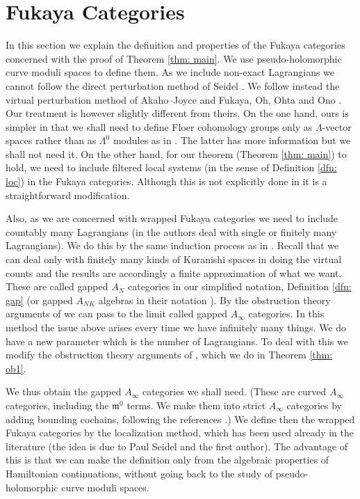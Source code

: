 \documentclass{article}
\theoremstyle{plain}%
\theoremstyle{definition}
\numberwithin{equation}{section}
\numberwithin{figure}{section}
\def\l{\label}
\def\fm{{\mathfrak m}}
\def\La{\Lambda}
\def\iy{\infty}
\begin{document}
\section{Fukaya Categories}\l{sec: Floer}
In this section we explain the definition and properties of the Fukaya categories concerned with the proof of Theorem \ref{thm: main}. We use pseudo-holomorphic curve moduli spaces to define them. As we include non-exact Lagrangians we cannot follow the direct perturbation method of Seidel \cite{Seid3}. We follow instead the virtual perturbation method of Akaho--Joyce \cite{AJ} and Fukaya, Oh, Ohta and Ono \cite{FOOO}. Our treatment is however slightly different from theirs. On the one hand, ours is simpler in that we shall need to define Floer cohomology groups only as $\La$-vector spaces rather than as $\La^0$ modules as in \cite{AJ,FOOO}. The latter has more information but we shall not need it. On the other hand, for our theorem (Theorem \ref{thm: main}) to hold, we need to include filtered local systems (in the sense of Definition \ref{dfn: loc}) in the Fukaya categories. Although this is not explicitly done in \cite{AJ,FOOO} it is a straightforward modification.

Also, as we are concerned with wrapped Fukaya categories we need to include countably many Lagrangians (in \cite{AJ,FOOO} the authors deal with single or finitely many Lagrangians). We do this by the same induction process as in \cite{AJ,FOOO}. Recall that we can deal only with finitely many kinds of Kuranishi spaces in doing the virtual counts \cite[\S7.2.3]{FOOO} and the results are accordingly a finite approximation of what we want. These are called gapped $A_N$ categories in our simplified notation, Definition \ref{dfn: gap} (or gapped $A_{NK}$ algebras in their notation \cite{AJ,FOOO}). By the obstruction theory arguments of \cite{AJ,FOOO} we can pass to the limit called gapped $A_\iy$ categories. In this method the issue \cite[\S7.2.3]{FOOO} above arises every time we have infinitely many things. We do have a new parameter which is the number of Lagrangians. To deal with this we modify the obstruction theory arguments of \cite{AJ,FOOO}, which we do in Theorem \ref{thm: ob1}.
 

We thus obtain the gapped $A_\iy$ categories we shall need. (These are curved $A_\iy$ categories, including the $\fm^0$ terms. We make them into strict $A_\iy$ categories by adding bounding cochains, following the references \cite{FOOO,AJ}.) We define then the wrapped Fukaya categories by the localization method, which has been used already in the literature \cite{GPS} (the idea is due to Paul Seidel and the first author). The advantage of this is that we can make the definition only from the algebraic properties of Hamiltonian continuations, without going back to the study of pseudo-holomorphic curve moduli spaces.
\end{document}
